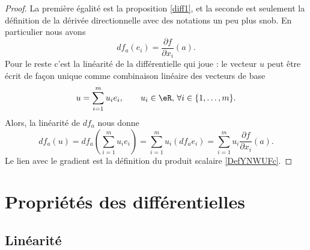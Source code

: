 \begin{proof}
La première égalité est la proposition \ref{diff1}, et la seconde est seulement la définition de la dérivée directionnelle avec des notations un peu plus snob. En particulier nous avons
\begin{equation}
    df_a(e_i)=\frac{ \partial f }{ \partial x_i }(a).
\end{equation}
Pour le reste c'est la linéarité de la différentielle qui joue : le vecteur $u$ peut être écrit de façon unique comme combinaison linéaire des vecteurs de base 
\[
u=\sum_{i=1}^{m}u_i e_i, \qquad  u_i\in\eR,\, \forall i\in\{1,\ldots, m\}.
\]
Alors, la linéarité de $df_a$ nous donne
\begin{equation}
     df_a(u)= df_a\left(\sum_{i=1}^{m}u_i e_i\right)
=\sum_{i=1}^{m}u_i \left(df_ae_i\right)
=\sum_{i=1}^{m}u_i \frac{ \partial f }{ \partial x_i }(a).
 \end{equation}
Le lien avec le gradient est la définition du produit scalaire \eqref{DefYNWUFc}.
\end{proof}

\section{Propriétés des différentielles}		\label{SecPropDiffs}

\subsection{Linéarité}

